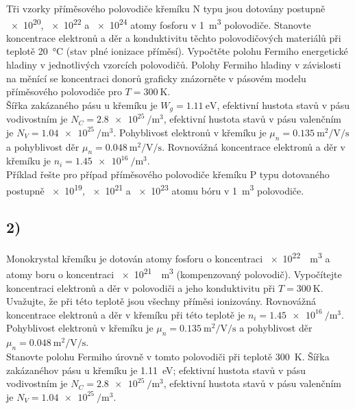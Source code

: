 Tři vzorky příměsového polovodiče křemíku N typu jsou dotovány postupně \SI{e20}{}, \SI{e22}{} a \SI{e24}{} atomy fosforu v \SI{1}{\cubic\meter} polovodiče. Stanovte koncentrace elektronů a děr a konduktivitu těchto polovodičových materiálů při teplotě \SI{20}{\degreeCelsius} (stav plné ionizace příměsí). Vypočtěte polohu Fermiho energetické hladiny v jednotlivých vzorcích polovodičů. Polohy Fermiho hladiny v závislosti na měnící se koncentraci donorů graficky znázorněte v pásovém modelu příměsového polovodiče pro $T=\SI{300}{\kelvin}$. \\
Šířka zakázaného pásu u křemíku je $W_g = \SI{1,11}{\electronvolt}$, efektivní hustota stavů v pásu vodivostním je $N_C = \SI{2,8e25}{\per\cubic\meter}$, efektivní hustota stavů v pásu valenčním je $N_V = \SI{1,04e25}{\per\cubic\meter}$. \break 
Pohyblivost elektronů v křemíku je $\mu_n = \SI{0,135}{\meter\squared\per\volt\per\second}$ a pohyblivost děr $\mu_n = \SI{0,048}{\meter\squared\per\volt\per\second}$. Rovnovážná koncentrace elektronů a děr v křemíku je $n_i = \SI{1,45e16}{\per\cubic\meter}$. \\
Příklad řešte pro případ příměsového polovodiče křemíku P typu dotovaného postupně \break \SI{e19}{}, \SI{e21}{} a \SI{e23}{} atomu bóru v \SI{1}{\cubic\meter} polovodiče.

\newpage


\subsection*{2)}

Monokrystal křemíku je dotován atomy fosforu o koncentraci \SI{e22}{\per\cubic\meter} a atomy boru o koncentraci \SI{e21}{\per\cubic\meter} (kompenzovaný polovodič). Vypočítejte koncentraci elektronů a děr v polovodiči a jeho konduktivitu při $T=\SI{300}{\kelvin}$. Uvažujte, že při této teplotě jsou všechny příměsi ionizovány. Rovnovážná koncentrace elektronů a děr v křemíku při této teplotě je $n_i = \SI{1,45e16}{\per\cubic\meter}$. Pohyblivost elektronů v křemíku je $\mu_n = \SI{0,135}{\meter\squared\per\volt\per\second}$ a pohyblivost děr $\mu_n = \SI{0,048}{\meter\squared\per\volt\per\second}$. \\
Stanovte polohu Fermiho úrovně v tomto polovodiči při teplotě \SI{300}{\kelvin}. Šířka zakázanéhov pásu u křemíku je \SI{1,11}{\electronvolt}; efektivní hustota stavů v pásu vodivostním je $N_C = \SI{2,8e25}{\per\cubic\meter}$, efektivní hustota stavů v pásu valenčním je $N_V = \SI{1,04e25}{\per\cubic\meter}$.

